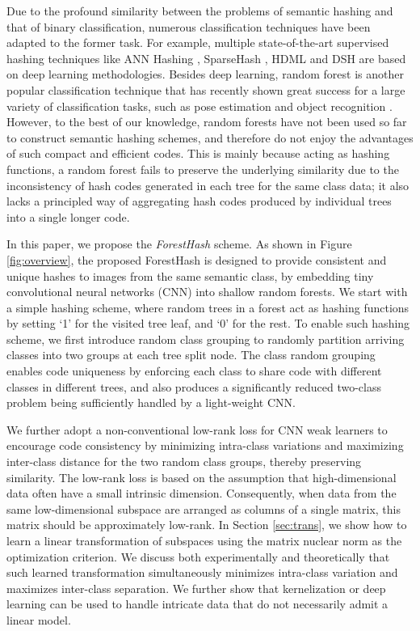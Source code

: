 \documentclass[runningheads]{llncs}
\begin{document}
Due to the profound similarity between the problems of semantic hashing and that
of binary classification, numerous classification techniques have been adapted
to the former task.  For example, multiple state-of-the-art supervised hashing
techniques like ANN Hashing \cite{MM-NN}, SparseHash \cite{sparsehash}, HDML
\cite{HDML} and DSH \cite{STH} are based on deep learning methodologies.
Besides deep learning, random forest \cite{RF2001, RFBook} is another popular
classification technique that has recently shown great success for a large
variety of classification tasks, such as pose estimation \cite{RF-pose} and
object recognition \cite{RF-obj}.  However, to the best of our knowledge, random
forests have not been used so far to construct semantic hashing schemes, and
therefore do not enjoy the advantages of such compact and efficient  codes.  This
is mainly because acting as hashing functions, a random forest fails to preserve
the underlying similarity due to the inconsistency of hash codes generated in
each tree for the same class data; it also lacks a principled way of aggregating
hash codes produced by individual trees into a single longer code.

In this paper, we propose the \emph{ForestHash} scheme.  As shown in Figure
\ref{fig:overview}, the proposed ForestHash is designed to provide consistent
and unique hashes to images from the same semantic class, by embedding tiny
convolutional neural networks (CNN) into shallow random forests.
  We start with a
simple hashing scheme, where random trees in a forest act as hashing functions
by setting `1' for the visited tree leaf, and `0' for the rest.  To enable such
hashing scheme, we first introduce random class grouping to randomly partition
arriving classes into two groups at each tree split node. The class random
grouping enables code uniqueness by enforcing each class to share code with
different classes in different trees, and also produces a significantly reduced
two-class problem being sufficiently handled by a light-weight CNN.


We further adopt a non-conventional low-rank loss for CNN weak learners to
encourage code consistency by minimizing intra-class variations and maximizing
inter-class distance for the two random class groups, thereby preserving
similarity.  The low-rank loss is based on the assumption that high-dimensional
data often have a small intrinsic dimension.  Consequently, when data from the
same low-dimensional subspace are arranged as columns of a single matrix, this
matrix should be approximately low-rank.  In Section \ref{sec:trans}, we show
how to learn a linear transformation of subspaces using the matrix nuclear norm
as the optimization criterion. We discuss both experimentally and theoretically
that such learned transformation simultaneously minimizes intra-class variation
and maximizes inter-class separation. We further show that kernelization or deep
learning can be used to handle intricate data that do not necessarily admit a
linear model.
\end{document}
